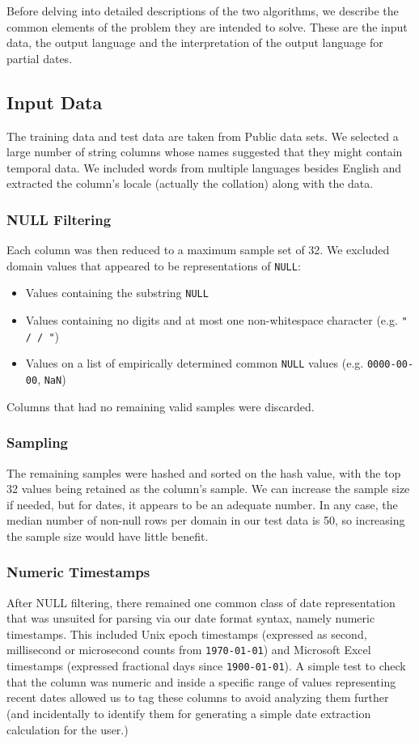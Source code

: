 Before delving into detailed descriptions of the two algorithms, we describe the common elements of the problem they are intended to solve. These are the input data, the output language and the interpretation of the output language for partial dates.

\subsection{Input Data}
The training data and test data are taken from Public data sets. We selected a large number of string columns whose names suggested that they might contain temporal data. We included words from multiple languages besides English and extracted the column's locale (actually the collation) along with the data.

\subsubsection{NULL Filtering}
Each column was then reduced to a maximum sample set of 32. We excluded domain values that appeared to be representations of \texttt{NULL}:
\begin{itemize}
\item Values containing the substring \texttt{NULL}
\item Values containing no digits and at most one non-whitespace character (e.g. \texttt{" / / "})
\item Values on a list of empirically determined common \texttt{NULL} values (e.g. \texttt{0000-00-00}, \texttt{NaN})
\end{itemize}
Columns that had no remaining valid samples were discarded. 

\subsubsection{Sampling}
The remaining samples were hashed and sorted on the hash value, with the top 32 values being retained as the column's sample. We can increase the sample size if needed, but for dates, it appears to be an adequate number. In any case, the median number of non-null rows per domain in our test data is 50, so increasing the sample size would have little benefit.

\subsubsection{Numeric Timestamps}
After NULL filtering, there remained one common class of date representation that was unsuited for parsing via our date format syntax, namely numeric timestamps. This included Unix epoch timestamps (expressed as second, millisecond or microsecond counts from \texttt{1970-01-01}) and Microsoft Excel timestamps (expressed fractional days since \texttt{1900-01-01}). A simple test to check that the column was numeric and inside a specific range of values representing recent dates allowed us to tag these columns to avoid analyzing them further (and incidentally to identify them for generating a simple date extraction calculation for the user.)

